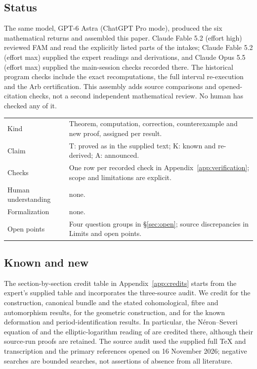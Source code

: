 \subsection*{Status}
The same model, GPT-6 Astra (ChatGPT Pro mode), produced the six mathematical returns and assembled this paper. Claude Fable 5.2 (effort high) reviewed FAM and read the explicitly listed parts of the intakes; Claude Fable 5.2 (effort max) supplied the expert readings and derivations, and Claude Opus 5.5 (effort max) supplied the main-session checks recorded there. The historical program checks include the exact recomputations, the full interval re-execution and the Arb certification. This assembly adds source comparisons and opened-citation checks, not a second independent mathematical review. No human has checked any of it.
\begin{center}\small
\begin{tabularx}{\linewidth}{@{}lY@{}}
\toprule Kind & Theorem, computation, correction, counterexample and new proof, assigned per result.\\
Claim & T: proved as in the supplied text; K: known and re-derived; A: announced.\\
Checks & One row per recorded check in Appendix~\ref{app:verification}; scope and limitations are explicit.\\
Human understanding & none.\\
Formalization & none.\\
Open points & Four question groups in \S\ref{sec:open}; source discrepancies in Limits and open points.\\\bottomrule
\end{tabularx}
\end{center}

\subsection*{Known and new}
The section-by-section credit table in Appendix~\ref{app:credits} starts from the expert's supplied table and incorporates the three-source audit. We credit \cite[Main Theorem; Sections 3--9]{AC26} for the construction, canonical bundle and the stated cohomological, fibre and automorphism results, \cite[Sections 2--8]{E26} for the geometric construction, and \cite[Theorems 1.3, 1.4, 7.1 and 7.2]{DGKXv1} for the known deformation and period-identification results. In particular, the N\'eron--Severi equation of \cite[Lemma 9.2]{AC26} and the elliptic-logarithm reading of \cite[Remark 3.12]{AC26} are credited there, although their source-run proofs are retained. The source audit used the supplied full TeX and transcription and the primary references opened on 16 November 2026; negative searches are bounded searches, not assertions of absence from all literature.

